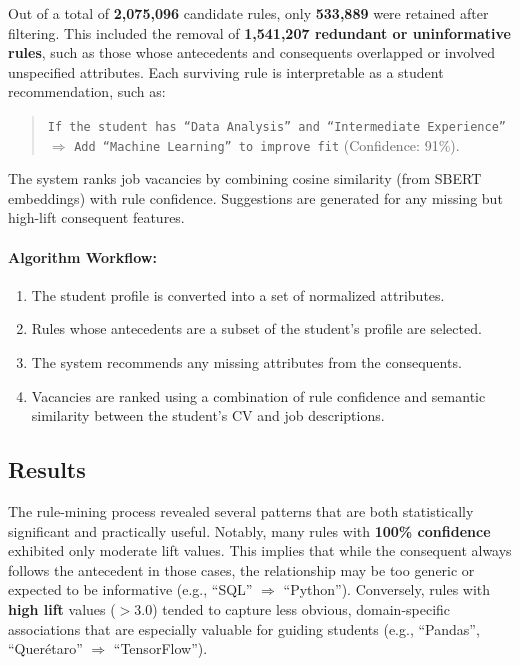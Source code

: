 \documentclass[runningheads]{llncs}
\begin{document}
	Out of a total of \textbf{2,075,096} candidate rules, only \textbf{533,889} were retained after filtering. This included the removal of \textbf{1,541,207 redundant or uninformative rules}, such as those whose antecedents and consequents overlapped or involved unspecified attributes. Each surviving rule is interpretable as a student recommendation, such as:
	
	\begin{quote}
		\small
		\texttt{If the student has “Data Analysis” and “Intermediate Experience”} $\Rightarrow$ \texttt{Add “Machine Learning” to improve fit} (Confidence: 91\%).
	\end{quote}
	
	The system ranks job vacancies by combining cosine similarity (from SBERT embeddings) with rule confidence. Suggestions are generated for any missing but high-lift consequent features.
	
	\vspace{0.5em}
	
	
	\paragraph{Algorithm Workflow:}
	\begin{enumerate}
		\item The student profile is converted into a set of normalized attributes.
		\item Rules whose antecedents are a subset of the student's profile are selected.
		\item The system recommends any missing attributes from the consequents.
		\item Vacancies are ranked using a combination of rule confidence and semantic similarity between the student's CV and job descriptions.
	\end{enumerate}
	
	\subsection{Results}
	
	The rule-mining process revealed several patterns that are both statistically significant and practically useful. Notably, many rules with \textbf{100\% confidence} exhibited only moderate lift values. This implies that while the consequent always follows the antecedent in those cases, the relationship may be too generic or expected to be informative (e.g., “SQL” $\Rightarrow$ “Python”). Conversely, rules with \textbf{high lift} values ($> 3.0$) tended to capture less obvious, domain-specific associations that are especially valuable for guiding students (e.g., “Pandas”, “Querétaro” $\Rightarrow$ “TensorFlow”).
	
\end{document}
